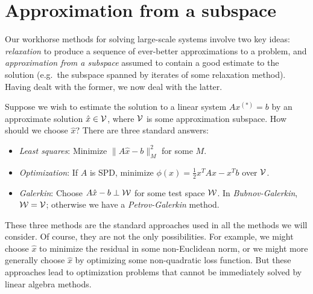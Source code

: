 \documentclass[12pt, leqno]{article} %
\begin{document}

\section{Approximation from a subspace}

Our workhorse methods for solving large-scale systems involve two
key ideas: {\em relaxation} to produce a sequence of ever-better
approximations to a problem, and {\em approximation from a subspace}
assumed to contain a good estimate to the solution (e.g.~the subspace
spanned by iterates of some relaxation method).  Having dealt with the
former, we now deal with the latter.

Suppose we wish to estimate the solution to a linear system $Ax^{(*)} = b$ by
an approximate solution $\hat{x} \in \mathcal{V}$, where $\mathcal{V}$ is some
approximation subspace.  How should we choose $\hat{x}$?  There are
three standard answers:
\begin{itemize}
\item {\em Least squares}: Minimize $\|A\hat{x}-b\|_M^2$ for some $M$.
\item {\em Optimization}: If $A$ is SPD, minimize $\phi(x) = \frac{1}{2} x^T A x - x^T b$ over $\mathcal{V}$.
\item {\em Galerkin}: Choose $A\hat{x}-b \perp \mathcal{W}$ for some test space $\mathcal{W}$.  In {\em Bubnov-Galerkin}, $\mathcal{W} = \mathcal{V}$; otherwise we have
a {\em Petrov-Galerkin} method.
\end{itemize}
These three methods are the standard approaches used in all the methods
we will consider.  Of course, they are not the only possibilities.
For example, we might choose $\hat{x}$ to minimize the residual in
some non-Euclidean norm, or we might more generally choose $\hat{x}$
by optimizing some non-quadratic loss function.  But these approaches lead
to optimization problems that cannot be immediately solved by linear
algebra methods.
\end{document}
